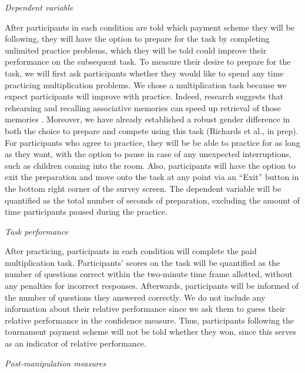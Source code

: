 \documentclass[a4paper, nobind]{templates/ociamthesis}
\begin{document}
\emph{Dependent variable}

After participants in each condition are told which payment scheme they will be following, they will have the option to prepare for the task by completing unlimited practice problems, which they will be told could improve their performance on the subsequent task. To measure their desire to prepare for the task, we will first ask participants whether they would like to spend any time practicing multiplication problems. We chose a multiplication task because we expect participants will improve with practice. Indeed, research suggests that rehearsing and recalling associative memories can speed up retrieval of those memories \autocite{Rundus1971}. Moreover, we have already established a robust gender difference in both the choice to prepare and compete using this task (Richards et al., in prep). For participants who agree to practice, they will be be able to practice for as long as they want, with the option to pause in case of any unexpected interruptions, such as children coming into the room. Also, participants will have the option to exit the preparation and move onto the task at any point via an ``Exit'' button in the bottom right corner of the survey screen. The dependent variable will be quantified as the total number of seconds of preparation, excluding the amount of time participants paused during the practice.

\emph{Task performance}

After practicing, participants in each condition will complete the paid multiplication task. Participants' scores on the task will be quantified as the number of questions correct within the two-minute time frame allotted, without any penalties for incorrect responses. Afterwards, participants will be informed of the number of questions they answered correctly. We do not include any information about their relative performance since we ask them to guess their relative performance in the confidence measure. Thus, participants following the tournament payment scheme will not be told whether they won, since this serves as an indicator of relative performance.

\emph{Post-manipulation measures}
\end{document}

